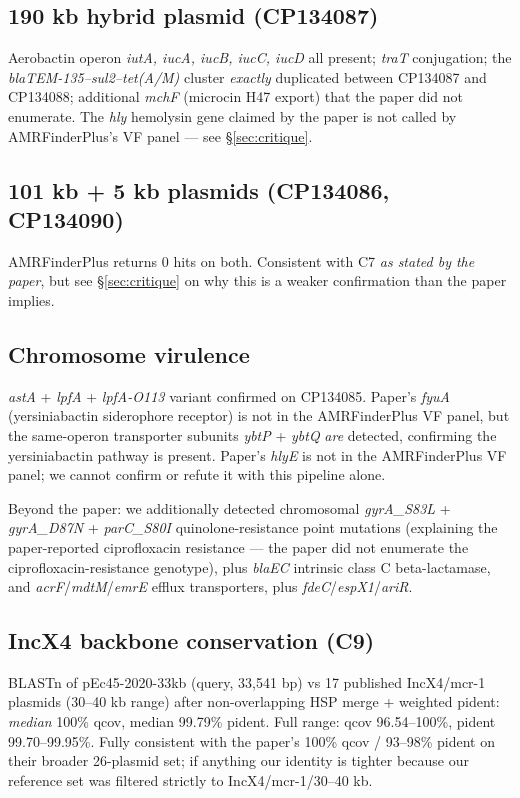 \documentclass[11pt]{article}
\begin{document}
\subsection{190 kb hybrid plasmid (CP134087)}
Aerobactin operon \emph{iutA, iucA, iucB, iucC, iucD} all present; \emph{traT} conjugation; the
\emph{blaTEM-135--sul2--tet(A/M)} cluster \emph{exactly} duplicated between CP134087 and CP134088;
additional \emph{mchF} (microcin H47 export) that the paper did not enumerate.
The \emph{hly} hemolysin gene claimed by the paper is not called by AMRFinderPlus's VF panel ---
see \S\ref{sec:critique}.

\subsection{101 kb + 5 kb plasmids (CP134086, CP134090)}
AMRFinderPlus returns 0 hits on both. Consistent with C7 \emph{as stated by the paper}, but see
\S\ref{sec:critique} on why this is a weaker confirmation than the paper implies.

\subsection{Chromosome virulence}
\emph{astA} + \emph{lpfA} + \emph{lpfA-O113} variant confirmed on CP134085. Paper's \emph{fyuA}
(yersiniabactin siderophore receptor) is not in the AMRFinderPlus VF panel, but the
same-operon transporter subunits \emph{ybtP} + \emph{ybtQ} \emph{are} detected, confirming the
yersiniabactin pathway is present. Paper's \emph{hlyE} is not in the AMRFinderPlus VF panel; we
cannot confirm or refute it with this pipeline alone.

Beyond the paper: we additionally detected chromosomal
\emph{gyrA\_S83L} + \emph{gyrA\_D87N} + \emph{parC\_S80I} quinolone-resistance point mutations
(explaining the paper-reported ciprofloxacin resistance --- the paper did not enumerate the
ciprofloxacin-resistance genotype), plus \emph{blaEC} intrinsic class C beta-lactamase, and
\emph{acrF}/\emph{mdtM}/\emph{emrE} efflux transporters, plus \emph{fdeC}/\emph{espX1}/\emph{ariR}.

\subsection{IncX4 backbone conservation (C9)}
BLASTn of pEc45-2020-33kb (query, 33{,}541 bp) vs 17 published IncX4/mcr-1 plasmids
(30--40 kb range) after non-overlapping HSP merge + weighted pident: \emph{median} 100\% qcov,
median 99.79\% pident. Full range: qcov 96.54--100\%, pident 99.70--99.95\%. Fully consistent
with the paper's 100\% qcov / 93--98\% pident on their broader 26-plasmid set; if anything our
identity is tighter because our reference set was filtered strictly to IncX4/mcr-1/30--40 kb.
\end{document}
